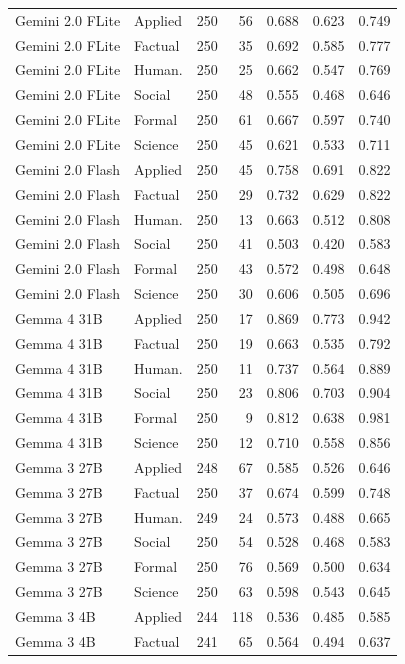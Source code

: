 \begin{longtable}{llrrrrr}
Gemini 2.0 FLite & Applied & 250 & 56 & 0.688 & 0.623 & 0.749 \\
Gemini 2.0 FLite & Factual & 250 & 35 & 0.692 & 0.585 & 0.777 \\
Gemini 2.0 FLite & Human. & 250 & 25 & 0.662 & 0.547 & 0.769 \\
Gemini 2.0 FLite & Social & 250 & 48 & 0.555 & 0.468 & 0.646 \\
Gemini 2.0 FLite & Formal & 250 & 61 & 0.667 & 0.597 & 0.740 \\
Gemini 2.0 FLite & Science & 250 & 45 & 0.621 & 0.533 & 0.711 \\
Gemini 2.0 Flash & Applied & 250 & 45 & 0.758 & 0.691 & 0.822 \\
Gemini 2.0 Flash & Factual & 250 & 29 & 0.732 & 0.629 & 0.822 \\
Gemini 2.0 Flash & Human. & 250 & 13 & 0.663 & 0.512 & 0.808 \\
Gemini 2.0 Flash & Social & 250 & 41 & 0.503 & 0.420 & 0.583 \\
Gemini 2.0 Flash & Formal & 250 & 43 & 0.572 & 0.498 & 0.648 \\
Gemini 2.0 Flash & Science & 250 & 30 & 0.606 & 0.505 & 0.696 \\
Gemma 4 31B & Applied & 250 & 17 & 0.869 & 0.773 & 0.942 \\
Gemma 4 31B & Factual & 250 & 19 & 0.663 & 0.535 & 0.792 \\
Gemma 4 31B & Human. & 250 & 11 & 0.737 & 0.564 & 0.889 \\
Gemma 4 31B & Social & 250 & 23 & 0.806 & 0.703 & 0.904 \\
Gemma 4 31B & Formal & 250 & 9 & 0.812 & 0.638 & 0.981 \\
Gemma 4 31B & Science & 250 & 12 & 0.710 & 0.558 & 0.856 \\
Gemma 3 27B & Applied & 248 & 67 & 0.585 & 0.526 & 0.646 \\
Gemma 3 27B & Factual & 250 & 37 & 0.674 & 0.599 & 0.748 \\
Gemma 3 27B & Human. & 249 & 24 & 0.573 & 0.488 & 0.665 \\
Gemma 3 27B & Social & 250 & 54 & 0.528 & 0.468 & 0.583 \\
Gemma 3 27B & Formal & 250 & 76 & 0.569 & 0.500 & 0.634 \\
Gemma 3 27B & Science & 250 & 63 & 0.598 & 0.543 & 0.645 \\
Gemma 3 4B & Applied & 244 & 118 & 0.536 & 0.485 & 0.585 \\
Gemma 3 4B & Factual & 241 & 65 & 0.564 & 0.494 & 0.637 \\

\end{longtable}

